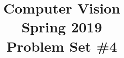 \documentclass[aspectratio=169]{beamer}
\title{Computer Vision\\ 
	    Spring 2019 \\ 
	    Problem Set \#4}
\author{\yourInfo{}}
\date{}
\begin{document}
	
	\frame{\titlepage}
	
	
	
	
	
	
	
	
	
\end{document}
